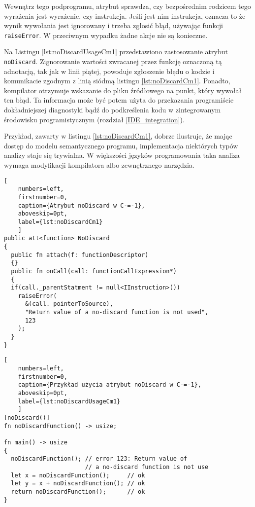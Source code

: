 Wewnątrz tego podprogramu, atrybut sprawdza, czy bezpośrednim rodzicem tego wyrażenia jest wyrażenie, czy instrukcja.
Jeśli jest nim instrukcja, oznacza to że wynik wywołania jest ignorowany i trzeba zgłosić błąd, używając funkcji \lstinline{raiseError}.
W przeciwnym wypadku żadne akcje nie są konieczne.

Na Listingu \ref{lst:noDiscardUsageCm1} przedstawiono zastosowanie atrybut \lstinline{noDiscard}.
Zignorowanie wartości zwracanej przez funkcję oznaczoną tą adnotacją, tak jak w linii piątej, powoduje zgłoszenie błędu o kodzie i komunikacie zgodnym z linią siódmą listingu \ref{lst:noDiscardCm1}.
Ponadto, kompilator otrzymuje wskazanie do pliku źródłowego na punkt, który wywołał ten błąd.
Ta informacja może być potem użyta do przekazania programiście dokładniejszej diagnostyki bądź do podkreślenia kodu w zintegrowanym środowisku programistycznym (rozdział \ref{IDE_integration}).

Przykład, zawarty w listingu \ref{lst:noDiscardCm1}, dobrze ilustruje, że mając dostęp do modelu semantycznego programu, implementacja niektórych typów analizy staje się trywialna.
W większości języków programowania taka analiza wymaga modyfikacji kompilatora albo zewnętrznego narzędzia.

\begin{minipage}{\linewidth}
  
  \begin{lstlisting}[
    numbers=left,
    firstnumber=0,
    caption={Atrybut noDiscard w C-=-1},
    aboveskip=0pt,
    label={lst:noDiscardCm1}
    ]
public att<function> NoDiscard
{
  public fn attach(f: functionDescriptor)
  {}
  public fn onCall(call: functionCallExpression*)
  {
  if(call._parentStatment != null<IInstruction>())
    raiseError(
      &(call._pointerToSource), 
      "Return value of a no-discard function is not used",
      123
    );
  }
}
\end{lstlisting}
\end{minipage}


\begin{minipage}{\linewidth}
  
  \begin{lstlisting}[
    numbers=left,
    firstnumber=0,
    caption={Przykład użycia atrybut noDiscard w C-=-1},
    aboveskip=0pt,
    label={lst:noDiscardUsageCm1}
    ]
[noDiscard()]
fn noDiscardFunction() -> usize;

fn main() -> usize
{
  noDiscardFunction(); // error 123: Return value of
                       // a no-discard function is not use
  let x = noDiscardFunction();     // ok
  let y = x + noDiscardFunction(); // ok
  return noDiscardFunction();      // ok
}
\end{lstlisting}
\end{minipage}

